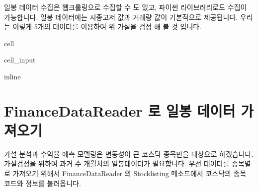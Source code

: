 \documentclass[letterpaper,10pt,english]{jupyterBook}
\begin{document}
\sphinxAtStartPar
일봉 데이터 수집은 웹크롤링으로 수집할 수 도 있고, 파이썬 라이브러리로도 수집이 가능합니다. 일봉 데이터에는 시종고저 값과 거래량 값이 기본적으로 제공됩니다. 우리는 이렇게 5개의 데이터를 이용하여 위 가설을 검정 해 볼 것 입니다.

\begin{sphinxuseclass}{cell}\begin{sphinxVerbatimInput}

\begin{sphinxuseclass}{cell_input}
\begin{sphinxVerbatim}[commandchars=\\\{\}]
   
   
 inline
 
    
   
   
 
 

  
\end{sphinxVerbatim}

\end{sphinxuseclass}\end{sphinxVerbatimInput}

\end{sphinxuseclass}

\section{FinanceDataReader 로 일봉 데이터 가져오기}
\label{\detokenize{chapter4/4.4.1_Data_Collection:financedatareader}}\label{\detokenize{chapter4/4.4.1_Data_Collection::doc}}
\sphinxAtStartPar
가설 분석과 수익율 예측 모델링은 변동성이 큰 코스닥 종목만을 대상으로 하겠습니다.
가설검정을 위하여 과거 수 개월치의 일봉데이터가 필요합니다. 우선 데이터를 종목별로 가져오기 위해서 FinanceDataReader 의 Stocklisting 메소드에서 코스닥의 종목 코드와 정보를 불러옵니다.
\end{document}
